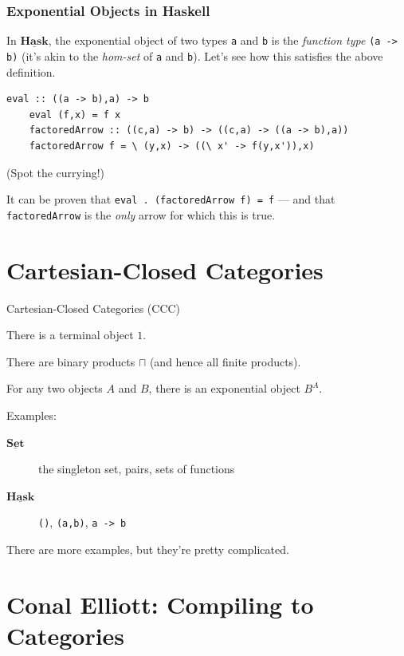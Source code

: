\documentclass[10pt]{beamer}
\newcommand{\Cat}[1]{\ensuremath{\underline{\mathbf{#1}}}}
\theoremstyle{definition}
\theoremstyle{remark}
\numberwithin{equation}{section}
\begin{document}
\begin{frame}
  \frametitle{Exponential Objects in Haskell}

  In $\Cat{Hask}$, the exponential object of two types \lstinline{a} and
  \lstinline{b} is the \emph{function type} \lstinline{(a -> b)} (it's akin to
  the \emph{hom-set} of \lstinline{a} and \lstinline{b}). Let's see
  how this satisfies the above definition.

  \begin{lstlisting}[frame=single]
    eval :: ((a -> b),a) -> b
    eval (f,x) = f x
    factoredArrow :: ((c,a) -> b) -> ((c,a) -> ((a -> b),a))
    factoredArrow f = \ (y,x) -> ((\ x' -> f(y,x')),x)
  \end{lstlisting}
  {\footnotesize{(Spot the currying!)}}

  It can be proven that \lstinline{eval . (factoredArrow f) = f} --- and that
  \lstinline{factoredArrow} is the \emph{only} arrow for which this is true.

\end{frame}

\section{Cartesian-Closed Categories}

\begin{frame}[fragile]{Cartesian-Closed Categories (CCC)}

  There is a terminal object $1$.

  There are binary products $\sqcap$ (and hence all finite products).

  For any two objects $A$ and $B$, there is an exponential object $B^A$.

  Examples:
  \begin{description}
    \item[\Cat{Set}] the singleton set, pairs, sets of functions
    \item[\Cat{Hask}] \lstinline{()}, \lstinline{(a,b)}, \lstinline{a -> b}
  \end{description}

  There are more examples, but they're pretty complicated.

\end{frame}

\section{Conal Elliott: Compiling to Categories} %
\end{document}
